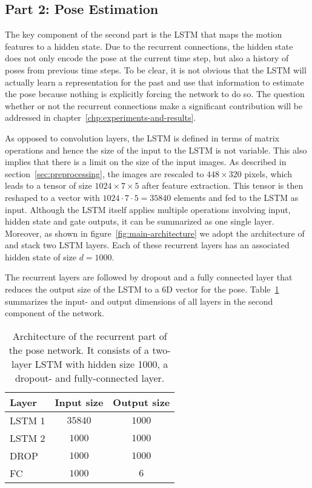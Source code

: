 		\subsection{Part 2: Pose Estimation}
			The key component of the second part is the LSTM that maps the motion features to a hidden state.
			Due to the recurrent connections, the hidden state does not only encode the pose at the current time step, but also a history of poses from previous time steps.
			To be clear, it is not obvious that the LSTM will actually learn a representation for the past and use that information to estimate the pose because nothing is explicitly forcing the network to do so.
			The question whether or not the recurrent connections make a significant contribution will be addressed in chapter~\ref{chp:experiments-and-results}.
			
			As opposed to convolution layers, the LSTM is defined in terms of matrix operations and hence the size of the input to the LSTM is not variable.
			This also implies that there is a limit on the size of the input images.
			As described in section~\ref{sec:preprocessing}, the images are rescaled to $448 \times 320$ pixels, which leads to a tensor of size $1024 \times 7 \times 5$ after feature extraction.
			This tensor is then reshaped to a vector with $1024 \cdot 7 \cdot 5 = 35840$ elements and fed to the LSTM as input.
			Although the LSTM itself applies multiple operations involving input, hidden state and gate outputs, it can be summarized as one single layer.
			Moreover, as shown in figure~\ref{fig:main-architecture} we adopt the architecture of~\citeauthor{wang2017deepvo} and stack two LSTM layers.
			Each of these recurrent layers has an associated hidden state of size $d = 1000$.
			
			The recurrent layers are followed by dropout and a fully connected layer that reduces the output size of the LSTM to a 6D vector for the pose.
			Table~\ref{tbl:lstm_and_fc_after_flownet} summarizes the input- and output dimensions of all layers in the second component of the network.
			\begin{table}[tb]
				\small
				\begin{center}
					\begin{tabular}{lcc}
						\toprule
						Layer 		& Input size 					& Output size			\\
						\midrule
						LSTM 1 		& $35840$						& $1000$  				\\
						LSTM 2 		& $1000$						& $1000$ 				\\
						DROP		& $1000$						& $1000$				\\
						FC 			& $1000$						& $6$					\\
						\bottomrule
					\end{tabular}
				\end{center}
				\caption[Architecture of the recurrent part of the pose network]
						{Architecture of the recurrent part of the pose network.
						 It consists of a two-layer LSTM with hidden size 1000, a dropout- and fully-connected layer.}
				\label{tbl:lstm_and_fc_after_flownet}
			\end{table}
		
